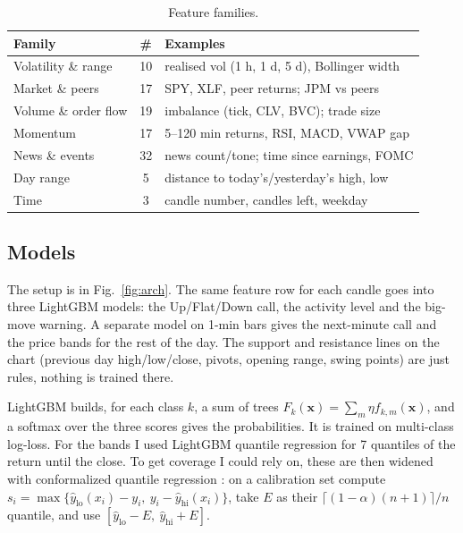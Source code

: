 \documentclass[11pt,a4paper]{article}
\begin{document}
\begin{table}[t]
\centering\small
\caption{Feature families.}
\label{tab:feat}
\begin{tabularx}{\columnwidth}{@{}l c X@{}}
\toprule
Family & \# & Examples \\
\midrule
Volatility \& range & 10 & realised vol (1 h, 1 d, 5 d), Bollinger width \\
Market \& peers & 17 & SPY, XLF, peer returns; JPM vs peers \\
Volume \& order flow & 19 & imbalance (tick, CLV, BVC); trade size \\
Momentum & 17 & 5--120 min returns, RSI, MACD, VWAP gap \\
News \& events & 32 & news count/tone; time since earnings, FOMC \\
Day range & 5 & distance to today's/yesterday's high, low \\
Time & 3 & candle number, candles left, weekday \\
\bottomrule
\end{tabularx}
\end{table}

\subsection{Models}
The setup is in Fig.~\ref{fig:arch}. The same feature row for each candle goes into three LightGBM models: the
Up/Flat/Down call, the activity level and the big-move warning. A separate model on 1-min bars gives the next-minute
call and the price bands for the rest of the day. The support and resistance lines on the chart (previous day
high/low/close, pivots, opening range, swing points) are just rules, nothing is trained there.

LightGBM \cite{ke2017} builds, for each class $k$, a sum of trees $F_k(\mathbf{x}) = \sum_m \eta f_{k,m}(\mathbf{x})$,
and a softmax over the three scores gives the probabilities. It is trained on multi-class log-loss. For the bands I
used LightGBM quantile regression for 7 quantiles of the return until the close. To get coverage I could rely on, these
are then widened with conformalized quantile regression \cite{romano2019}: on a calibration set compute
$s_i = \max\{\hat y_{\text{lo}}(x_i) - y_i,\ y_i - \hat y_{\text{hi}}(x_i)\}$, take $E$ as their
$\lceil(1-\alpha)(n+1)\rceil/n$ quantile, and use $[\hat y_{\text{lo}} - E,\ \hat y_{\text{hi}} + E]$.
\end{document}
